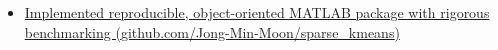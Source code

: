 \documentclass[letterpaper,11pt]{article}
\begin{document}
\begin{itemize}[leftmargin=0in, label={}]
\begin{itemize}[leftmargin=0.14in]
	\vspace{-1.5pt}
	\item \small %
	\href{https://github.com/Jong-Min-Moon/sparse_kmeans}{Implemented  reproducible, object-oriented MATLAB package with rigorous benchmarking (\url{github.com/Jong-Min-Moon/sparse_kmeans})
	}
\end{itemize}
\end{itemize}
\vspace{-13.55pt}
%
%
\end{document}

